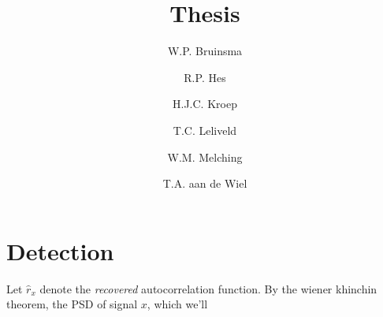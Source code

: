 \documentclass[a4paper, openany, oneside]{memoir}
\title{Thesis}
\author{W.P. Bruinsma \and R.P. Hes \and H.J.C. Kroep \and T.C. Leliveld \and W.M. Melching \and T.A. aan de Wiel}
\begin{document}
\frontmatter

\begin{titlingpage}
  \pagestyle{empty}
  \maketitle
\end{titlingpage}

\chapter{Detection}

Let $\hat{r}_x$ denote the \textit{recovered} autocorrelation function. By the wiener khinchin theorem, the PSD of signal $x$, which we'll
\end{document}

